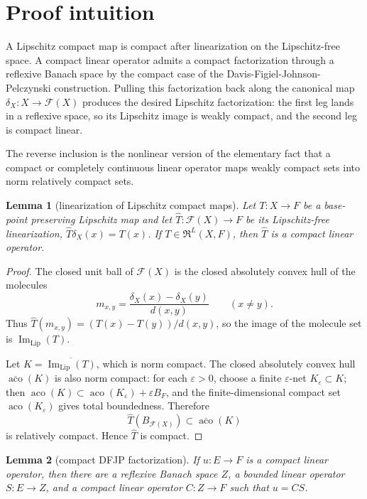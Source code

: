 \documentclass[11pt]{article}
\newtheorem{lemma}{Lemma}
\newcommand{\Lip}{\operatorname{Lip}}
\newcommand{\aco}{\operatorname{aco}}
\newcommand{\ImLip}{\operatorname{Im}_{\Lip}}
\newcommand{\F}{\mathcal F}
\newcommand{\R}{\mathfrak R}
\begin{document}
\section*{Proof intuition}

A Lipschitz compact map is compact after linearization on the Lipschitz-free space.  A compact linear operator admits a compact factorization through a reflexive Banach space by the compact case of the Davis-Figiel-Johnson-Pelczynski construction.  Pulling this factorization back along the canonical map \(\delta_X:X\to\F(X)\) produces the desired Lipschitz factorization: the first leg lands in a reflexive space, so its Lipschitz image is weakly compact, and the second leg is compact linear.

The reverse inclusion is the nonlinear version of the elementary fact that a compact or completely continuous linear operator maps weakly compact sets into norm relatively compact sets.

\begin{lemma}[linearization of Lipschitz compact maps]\label{lem:linearization}
Let \(T:X\to F\) be a base-point preserving Lipschitz map and let \(\widehat T:\F(X)\to F\) be its Lipschitz-free linearization, \(\widehat T\delta_X(x)=T(x)\).  If \(T\in\R^L(X,F)\), then \(\widehat T\) is a compact linear operator.
\end{lemma}

\begin{proof}
The closed unit ball of \(\F(X)\) is the closed absolutely convex hull of the molecules
\[
  m_{x,y}=\frac{\delta_X(x)-\delta_X(y)}{d(x,y)}\qquad (x\ne y).
\]
Thus \(\widehat T(m_{x,y})=(T(x)-T(y))/d(x,y)\), so the image of the molecule set is \(\ImLip(T)\).

Let \(K=\overline{\ImLip(T)}\), which is norm compact.  The closed absolutely convex hull \(\overline{\aco}(K)\) is also norm compact: for each \(\varepsilon>0\), choose a finite \(\varepsilon\)-net \(K_\varepsilon\subset K\); then \(\aco(K)\subset \aco(K_\varepsilon)+\varepsilon B_F\), and the finite-dimensional compact set \(\aco(K_\varepsilon)\) gives total boundedness.  Therefore
\[
  \widehat T(B_{\F(X)})\subset \overline{\aco}(K)
\]
is relatively compact.  Hence \(\widehat T\) is compact.
\end{proof}

\begin{lemma}[compact DFJP factorization]\label{lem:compact-dfjp}
If \(u:E\to F\) is a compact linear operator, then there are a reflexive Banach space \(Z\), a bounded linear operator \(S:E\to Z\), and a compact linear operator \(C:Z\to F\) such that \(u=C S\).
\end{lemma}
\end{document}
